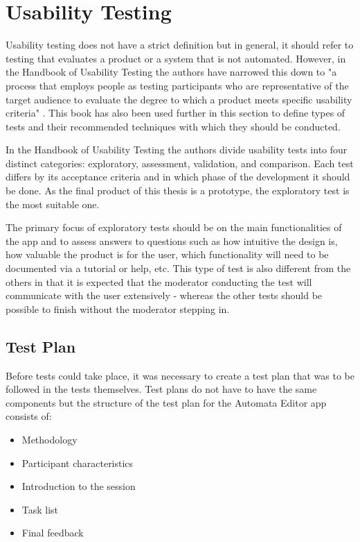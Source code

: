 \section{Usability Testing}

Usability testing does not have a strict definition but in general, it should refer to testing that evaluates a product or a system that is not automated. However, in the Handbook of Usability Testing the authors have narrowed this down to "a process that employs people as testing participants who are representative of the target audience to evaluate the degree to which a product meets specific usability criteria" \cite{handbook-usability-testing}. This book has also been used further in this section to define types of tests and their recommended techniques with which they should be conducted.

In the Handbook of Usability Testing the authors divide usability tests into four distinct categories: exploratory, assessment, validation, and comparison. Each test differs by its acceptance criteria and in which phase of the development it should be done. As the final product of this thesis is a prototype, the exploratory test is the most suitable one.

The primary focus of exploratory tests should be on the main functionalities of the app and to assess answers to questions such as how intuitive the design is, how valuable the product is for the user, which functionality will need to be documented via a tutorial or help, etc. This type of test is also different from the others in that it is expected that the moderator conducting the test will communicate with the user extensively - whereas the other tests should be possible to finish without the moderator stepping in.

\subsection{Test Plan}

Before tests could take place, it was necessary to create a test plan that was to be followed in the tests themselves. Test plans do not have to have the same components but the structure of the test plan for the Automata Editor app consists of:
\begin{itemize}
    \item Methodology
    \item Participant characteristics
    \item Introduction to the session
    \item Task list
    \item Final feedback
\end{itemize}

